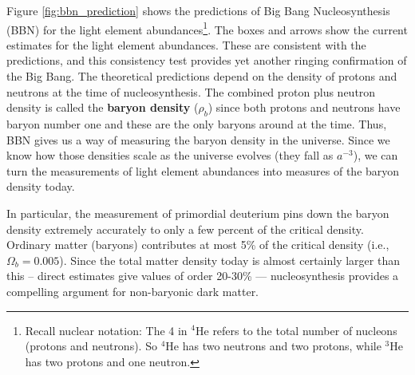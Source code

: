 \documentclass[a4paper,11pt]{article}
\begin{document}
{\noindent}Figure \ref{fig:bbn_prediction} shows the predictions of Big Bang Nucleosynthesis (BBN) for the light element abundances\footnote{Recall nuclear notation: The 4 in $^4$He refers to the total number of nucleons (protons and neutrons). So $^4$He has two neutrons and two protons, while $^3$He has two protons and one neutron.}. The boxes and arrows show the current estimates for the light element abundances. These are consistent with the predictions, and this consistency test provides yet another ringing confirmation of the Big Bang. The theoretical predictions depend on the density of protons and neutrons at the time of nucleosynthesis. The combined proton plus neutron density is called the \textbf{baryon density} ($\rho_b$) since both protons and neutrons have baryon number one and these are the only baryons around at the time. Thus, BBN gives us a way of measuring the baryon density in the universe. Since we know how those densities scale as the universe evolves (they fall as $a^{-3}$), we can turn the measurements of light element abundances into measures of the baryon density today.

{\noindent}In particular, the measurement of primordial deuterium pins down the baryon density extremely accurately to only a few percent of the critical density. Ordinary matter (baryons) contributes at most 5\% of the critical density (i.e., $\Omega_b = 0.005$). Since the total matter density today is almost certainly larger than this -- direct estimates give values of order 20-30\% — nucleosynthesis provides a compelling argument for non-baryonic dark matter.
\end{document}
